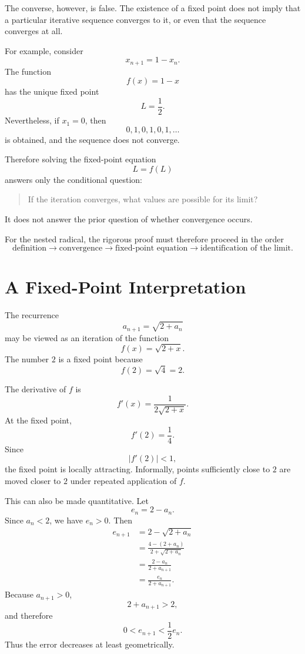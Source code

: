 \documentclass{essay}
\begin{document}
The converse, however, is false. The existence of a fixed point does not imply that a particular iterative sequence converges to it, or even that the sequence converges at all.

For example, consider
\[
x_{n+1}=1-x_n.
\]
The function
\[
f(x)=1-x
\]
has the unique fixed point
\[
L=\frac12.
\]
Nevertheless, if \(x_1=0\), then
\[
0,1,0,1,0,1,\ldots
\]
is obtained, and the sequence does not converge.

Therefore solving the fixed-point equation
\[
L=f(L)
\]
answers only the conditional question:

\begin{quote}
If the iteration converges, what values are possible for its limit?
\end{quote}

It does not answer the prior question of whether convergence occurs.

For the nested radical, the rigorous proof must therefore proceed in the order
\[
\text{definition}
\longrightarrow
\text{convergence}
\longrightarrow
\text{fixed-point equation}
\longrightarrow
\text{identification of the limit}.
\]

\section{A Fixed-Point Interpretation}

The recurrence
\[
a_{n+1}=\sqrt{2+a_n}
\]
may be viewed as an iteration of the function
\[
f(x)=\sqrt{2+x}.
\]
The number \(2\) is a fixed point because
\[
f(2)=\sqrt{4}=2.
\]

The derivative of \(f\) is
\[
f'(x)=\frac{1}{2\sqrt{2+x}}.
\]
At the fixed point,
\[
f'(2)=\frac14.
\]
Since
\[
|f'(2)|<1,
\]
the fixed point is locally attracting. Informally, points sufficiently close to \(2\) are moved closer to \(2\) under repeated application of \(f\).

This can also be made quantitative. Let
\[
e_n=2-a_n.
\]
Since \(a_n<2\), we have \(e_n>0\). Then
\begin{align*}
e_{n+1}
&=
2-\sqrt{2+a_n}\\
&=
\frac{4-(2+a_n)}
     {2+\sqrt{2+a_n}}\\
&=
\frac{2-a_n}
     {2+a_{n+1}}\\
&=
\frac{e_n}{2+a_{n+1}}.
\end{align*}
Because \(a_{n+1}>0\),
\[
2+a_{n+1}>2,
\]
and therefore
\[
0<e_{n+1}<\frac12 e_n.
\]
Thus the error decreases at least geometrically.
\end{document}
